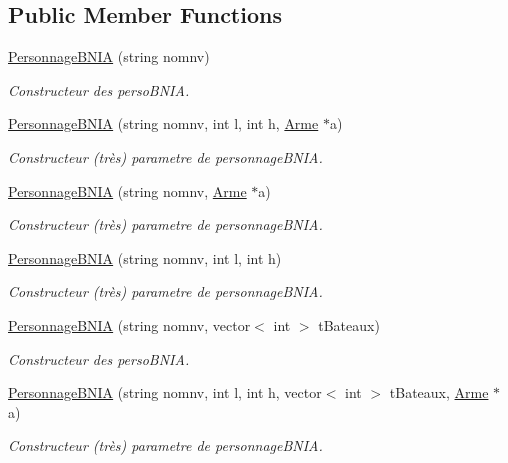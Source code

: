 \subsection*{Public Member Functions}
\begin{DoxyCompactItemize}
\item 
\hyperlink{classPersonnageBNIA_a556e1751c26c06b8362a52ced1e59d46}{Personnage\-B\-N\-I\-A} (string nomnv)
\begin{DoxyCompactList}\small\item\em Constructeur des perso\-B\-N\-I\-A. \end{DoxyCompactList}\item 
\hyperlink{classPersonnageBNIA_a8eab753e71d557f78c0d66d92ff37b11}{Personnage\-B\-N\-I\-A} (string nomnv, int l, int h, \hyperlink{classArme}{Arme} $\ast$a)
\begin{DoxyCompactList}\small\item\em Constructeur (très) parametre de personnage\-B\-N\-I\-A. \end{DoxyCompactList}\item 
\hyperlink{classPersonnageBNIA_ab4e905ea8c6e7f6eab33337d77994eb9}{Personnage\-B\-N\-I\-A} (string nomnv, \hyperlink{classArme}{Arme} $\ast$a)
\begin{DoxyCompactList}\small\item\em Constructeur (très) parametre de personnage\-B\-N\-I\-A. \end{DoxyCompactList}\item 
\hyperlink{classPersonnageBNIA_a5dafceeaf4f7301be3f9c323d1c49fa6}{Personnage\-B\-N\-I\-A} (string nomnv, int l, int h)
\begin{DoxyCompactList}\small\item\em Constructeur (très) parametre de personnage\-B\-N\-I\-A. \end{DoxyCompactList}\item 
\hyperlink{classPersonnageBNIA_aa71da7518d1499bf69df71d7edff00b0}{Personnage\-B\-N\-I\-A} (string nomnv, vector$<$ int $>$ t\-Bateaux)
\begin{DoxyCompactList}\small\item\em Constructeur des perso\-B\-N\-I\-A. \end{DoxyCompactList}\item 
\hyperlink{classPersonnageBNIA_afc0183ca85ebcdce1bf714864e6a0dae}{Personnage\-B\-N\-I\-A} (string nomnv, int l, int h, vector$<$ int $>$ t\-Bateaux, \hyperlink{classArme}{Arme} $\ast$a)
\begin{DoxyCompactList}\small\item\em Constructeur (très) parametre de personnage\-B\-N\-I\-A. \end{DoxyCompactList}\item 

\end{DoxyCompactItemize}
